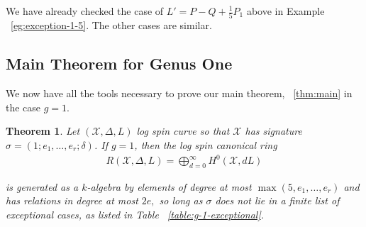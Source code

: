 \documentclass{amsart}
\theoremstyle{plain}
\newtheorem{thm}{Theorem}[section]
\theoremstyle{definition}
\newtheorem{example}[thm]{Example}
\theoremstyle{remark}
\numberwithin{equation}{section}
\newcommand\ssec{\subsection}
\DeclareMathOperator\di{Div}
\newcommand\sx{\mathscr X}
\newcommand{\halfcan}{L}
\begin{document}
We have already checked the case of 
$L' = P - Q + \frac{1}{5}P_1$ above in Example ~\ref{eg:exception-1-5}. The other cases are similar.


%
%
%


\ssec{Main Theorem for Genus One}
\label{ssec:main_g_1}

We now have all the tools necessary to prove our main theorem, ~\ref{thm:main} in the case $g = 1$. 

\begin{thm}
\label{thm:g-1-main}
Let $(\sx, \Delta, \halfcan)$ log spin curve so that $\sx$ has signature $\sigma = (1; e_1, \ldots, e_r; \delta)$.
If $g = 1$, then the log spin canonical ring
\begin{align*}
	R(\sx, \Delta, \halfcan) = \bigoplus_{d = 0}^\infty H^0(\sx, d L)
\end{align*}

\noindent
is generated as a $k$-algebra by elements of degree at most $\max(5, e_1, \ldots, e_r)$ and has relations in degree at most $2e,$ so long as $\sigma$ does not lie in a
finite list of exceptional cases, as listed in Table
~\ref{table:g-1-exceptional}.
\end{thm}
\end{document}
